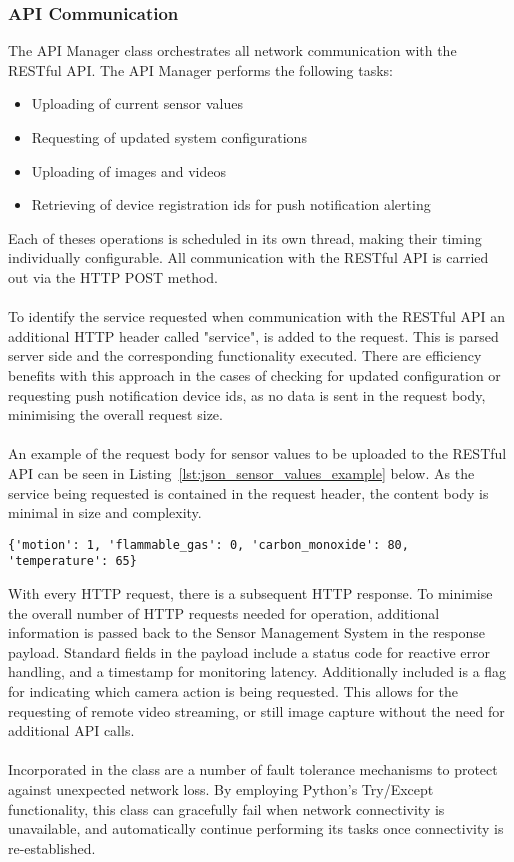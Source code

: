 \documentclass{article}
\begin{document}
\subsubsection{API Communication}
\label{sssec:sms_api_comm}
The API Manager class orchestrates all network communication with the RESTful API.
The API Manager performs the following tasks:
\begin{itemize}
  \item Uploading of current sensor values
  \item Requesting of updated system configurations
  \item Uploading of images and videos
  \item Retrieving of device registration ids for push notification alerting
\end{itemize}
Each of theses operations is scheduled in its own thread, making their timing individually configurable.  All communication with the RESTful API is carried out via the HTTP POST method.\\\\
To identify the service requested when communication with the RESTful API an additional HTTP header called "service", is added to the request. This is parsed server side and the corresponding functionality executed. There are efficiency benefits with this approach in the cases of checking for updated configuration or requesting push notification device ids, as no data is sent in the request body, minimising the overall request size. \\\\
An example of the request body for sensor values to be uploaded to the RESTful API can be seen in Listing~\ref{lst:json_sensor_values_example} below. As the service being requested is contained in the request header, the content body is minimal in size and complexity.
\begin{center}
\begin{lstlisting}[caption={Sensor Values Request Body Example},label={lst:json_sensor_values_example}]
{'motion': 1, 'flammable_gas': 0, 'carbon_monoxide': 80, 'temperature': 65}
\end{lstlisting}
\end{center}
With every HTTP request, there is a subsequent HTTP response. To minimise the overall number of HTTP requests needed for operation, additional information is passed back to the Sensor Management System in the response payload. Standard fields in the payload include a status code for reactive error handling, and a timestamp for monitoring latency. Additionally included is a flag for indicating which camera action is being requested. This allows for the requesting of remote video streaming, or still image capture without the need for additional API calls. \\\\
Incorporated in the class are a number of fault tolerance mechanisms to protect against unexpected network loss. By employing Python’s Try/Except functionality, this class can gracefully fail when network connectivity is unavailable, and automatically continue performing its tasks once connectivity is re-established.
\end{document}
